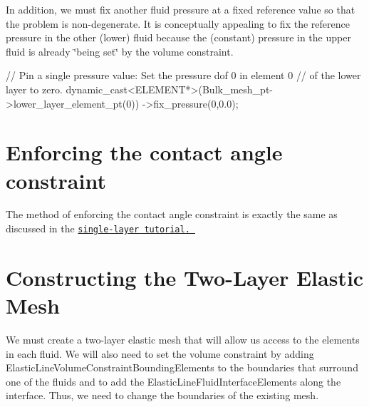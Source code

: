 In addition, we must fix another fluid pressure at a fixed reference value so that the problem is non-\/degenerate. It is conceptually appealing to fix the reference pressure in the other (lower) fluid because the (constant) pressure in the upper fluid is already \char`\"{}being set\char`\"{} by the volume constraint.


\begin{DoxyCodeInclude}
 \textcolor{comment}{// Pin a single pressure value: Set the pressure dof 0 in element 0}
 \textcolor{comment}{// of the lower layer to zero.}
 \textcolor{keyword}{dynamic\_cast<}ELEMENT*\textcolor{keyword}{>}(Bulk\_mesh\_pt->lower\_layer\_element\_pt(0))
  ->fix\_pressure(0,0.0);

\end{DoxyCodeInclude}
\hypertarget{index_contact_angle}{}\section{Enforcing the contact angle constraint}\label{index_contact_angle}
The method of enforcing the contact angle constraint is exactly the same as discussed in the \href{../../static_single_layer/html/index.html#contact_angle}{\tt single-\/layer tutorial. }\hypertarget{index_mesh}{}\section{Constructing the Two-\/\+Layer Elastic Mesh}\label{index_mesh}
We must create a two-\/layer elastic mesh that will allow us access to the elements in each fluid. We will also need to set the volume constraint by adding {\ttfamily Elastic\+Line\+Volume\+Constraint\+Bounding\+Elements} to the boundaries that surround one of the fluids and to add the {\ttfamily Elastic\+Line\+Fluid\+Interface\+Elements} along the interface. Thus, we need to change the boundaries of the existing mesh.

